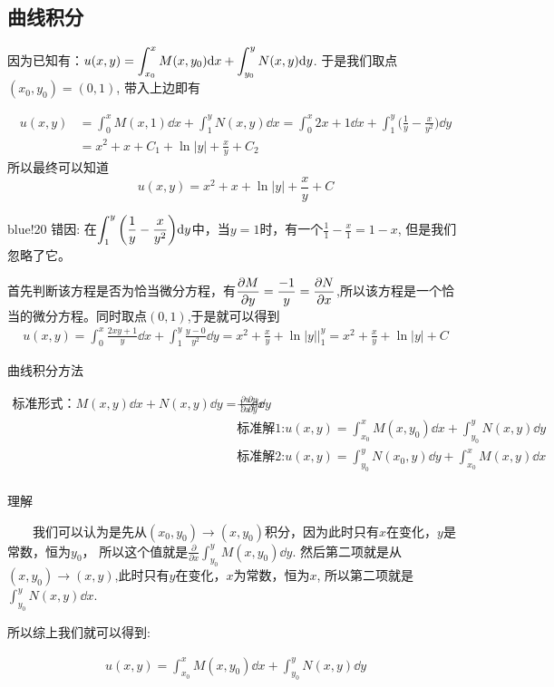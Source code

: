 \subsection{曲线积分}

因为已知有：$\displaystyle u(x,y)=\int_{x_0}^{x}{M(x,y_0) \mathrm{d} x}+\int_{y_0}^{y}{N(x,y) \mathrm{d} y}$.
于是我们取点$(x_0,y_0)=(0, 1)$, 带入上边即有

\begin{align*}
u(x,y)& = \int_{0}^{x}{M(x,1) \dd x}+\int_{1}^{y}{N(x,y) \dd x}
        = \int_{0}^{x}{ 2x+1 \dd x}+\int_{1}^{y}{\bigg(\frac{1}{y}-\frac{x}{y^2}\bigg) \dd y}\\
      & = x^2 + x + C_1 + \ln|y|+\frac{x}{y} + C_2
\end{align*}
所以最终可以知道
\[
    u(x,y)=x^2+x+\ln|y|+\frac{x}{y}+C    
\]


\begin{formal}{blue!20}
    错因: 在$\displaystyle \int_{1}^{y}{\bigg(\frac{1}{y}-\frac{x}{y^2}\bigg)}\mathrm{d} y$中，当$y=1$时，有一个$\frac{1}{1}-\frac{x}{1}=1-x$, 但是我们忽略了它。
\end{formal}


首先判断该方程是否为恰当微分方程，有$\displaystyle \frac{\partial M}{\partial y}=\frac{-1}{y}=\frac{\partial N}{\partial x}$,所以该方程是一个恰当的微分方程。同时取点$(0, 1)$,于是就可以得到
\begin{align*}
    u(x,y) =\int_{0}^{x}{\frac{2xy+1}{y}\dd x + \int_{1}^{y}{\frac{y-0}{y^2}} \dd y} 
        = x^2+\frac{x}{y}+\ln|y|\bigg|_{1}^{y}
        = x^2+\frac{x}{y}+\ln|y|+C
\end{align*} 

\textsf{曲线积分方法}

\begin{theorem}[曲线积分法]
$
    \begin{aligned}
        \text{标准形式：}M(x,y)\dd x+N(x,y)\dd y=\frac{\partial u}{\partial x}\dd x&+\frac{\partial u}{\partial y}\dd y\\
        &\text{标准解1:}u(x,y)=\int_{x_0}^{x}{M(x,y_0)\dd x} + \int_{y_0}^{y}{N(x,y) \dd y}\\
        &\text{标准解2:}u(x,y)=\int_{y_0}^{y}{N(x_0,y)\dd y} + \int_{x_0}^{x}{M(x,y) \dd x}\\
    \end{aligned}
$ 

\textsf{理解}


~~~~我们可以认为是先从$(x_0, y_0)\to(x, y_0)$积分，因为此时只有$x$在变化，$y$是常数，恒为$y_0$，
所以这个值就是$\frac{\partial }{\partial x}\int_{y_0}^{y}{M(x,y_0) \dd y}$.
然后第二项就是从$(x, y_0)\to (x, y)$,此时只有$y$在变化，$x$为常数，恒为$x$,
所以第二项就是$\int_{y_0}^{y}{N(x, y) \dd x}$.

所以综上我们就可以得到:

\begin{align}
    u(x,y)=\int_{x_0}^{x}{M(x,y_0) \dd x} + \int_{y_0}^{y}{N(x,y) \dd y}
\end{align}
\end{theorem}

